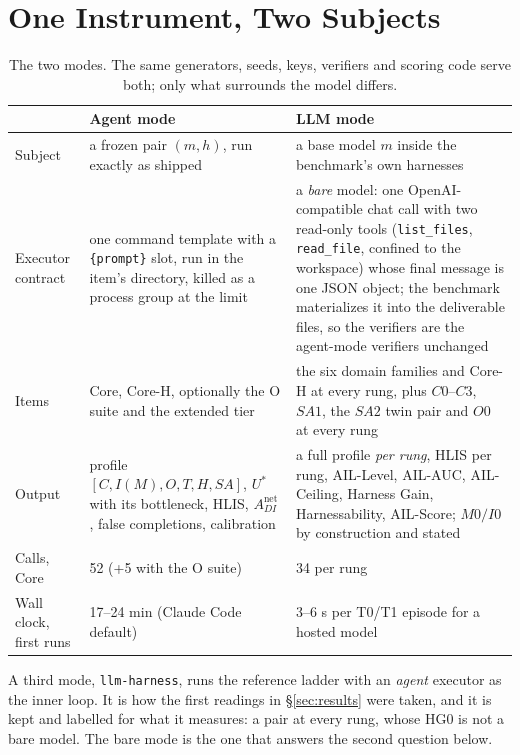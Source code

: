 \section{One Instrument, Two Subjects}\label{sec:two}

\begin{table}[!htbp]
\centering\small
\begin{tabularx}{\textwidth}{@{}lYY@{}}
\toprule
 & Agent mode & LLM mode \\
\midrule
Subject & a frozen pair $(m,h)$, run exactly as shipped & a base model $m$ inside the benchmark's own harnesses \\
Executor contract & one command template with a \texttt{\{prompt\}} slot, run in the item's directory, killed as a process group at the limit & a \emph{bare} model: one OpenAI-compatible chat call with two read-only tools (\texttt{list\_files}, \texttt{read\_file}, confined to the workspace) whose final message is one JSON object; the benchmark materializes it into the deliverable files, so the verifiers are the agent-mode verifiers unchanged \\
Items & Core, Core-H, optionally the O suite and the extended tier & the six domain families and Core-H at every rung, plus $C0$--$C3$, $SA1$, the $SA2$ twin pair and $O0$ at every rung \\
Output & profile $[C, I(M), O, T, H, SA]$, $U^{*}$ with its bottleneck, HLIS, $A^{\text{net}}_{DI}$, false completions, calibration & a full profile \emph{per rung}, HLIS per rung, AIL-Level, AIL-AUC, AIL-Ceiling, Harness Gain, Harnessability, AIL-Score; $M0/I0$ by construction and stated \\
Calls, Core & 52 (+5 with the O suite) & 34 per rung \\
Wall clock, first runs & 17--24 min (Claude Code default) & 3--6 s per T0/T1 episode for a hosted model \\
\bottomrule
\end{tabularx}
\caption{The two modes. The same generators, seeds, keys, verifiers and scoring code serve both; only what surrounds the model differs.}
\label{tab:modes}
\end{table}

A third mode, \texttt{llm-harness}, runs the reference ladder with an \emph{agent} executor as the inner loop. It is how the first readings in \S\ref{sec:results} were taken, and it is kept and labelled for what it measures: a pair at every rung, whose HG0 is not a bare model. The bare mode is the one that answers the second question below.

